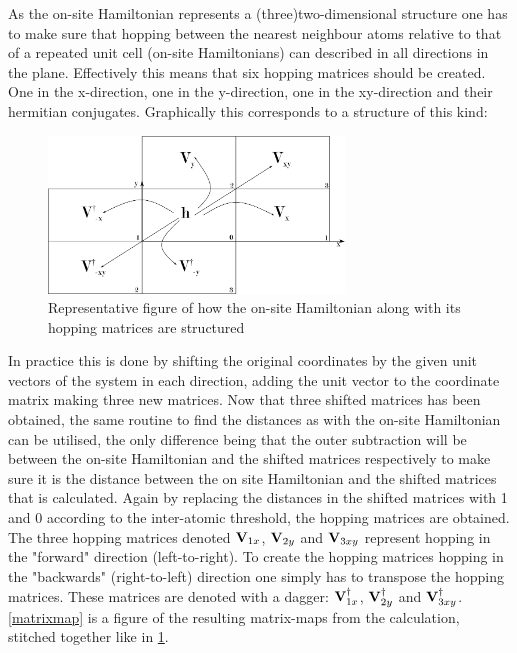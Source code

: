 As the on-site Hamiltonian represents a (three)two-dimensional structure one has to make sure that hopping between the nearest neighbour atoms relative to that of a repeated unit cell (on-site Hamiltonians) can described in all directions in the plane. Effectively this means that six hopping matrices should be created. One in the x-direction, one in the y-direction, one in the xy-direction and their hermitian conjugates. Graphically this corresponds to a structure of this kind:
\begin{figure}[H]
    \centering
    \includegraphics[width = 0.7\textwidth]{Figures/name/repfig.eps}
    \caption{Representative figure of how the on-site Hamiltonian along with its hopping matrices are structured}
    \label{repfig}
\end{figure}
In practice this is done by shifting the original coordinates by the given unit vectors of the system in each direction, adding the unit vector to the coordinate matrix making three new matrices. Now that three shifted matrices has been obtained, the same routine to find the distances as with the on-site Hamiltonian can be utilised, the only difference being that the outer subtraction will be between the on-site Hamiltonian and the shifted matrices respectively to make sure it is the distance between the on site Hamiltonian and the shifted matrices that is calculated. Again by replacing the distances in the shifted matrices with 1 and 0 according to the inter-atomic threshold, the hopping matrices are obtained. The three hopping matrices denoted \(\vb{V}_{1x}\), \(\vb{V}_{2y}\) and \(\vb{V}_{3xy}\) represent hopping in the "forward" direction (left-to-right). To create the hopping matrices hopping in the "backwards" (right-to-left) direction one simply has to transpose the hopping matrices. These matrices are denoted with a dagger: \(\vb{V}_{1x}^{\dagger}\), \(\vb{V}_{2y}^{\dagger}\) and \(\vb{V}_{3xy}^{\dagger}\). \cref{matrixmap} is a figure of the resulting matrix-maps from the calculation, stitched together like in \cref{repfig}.

